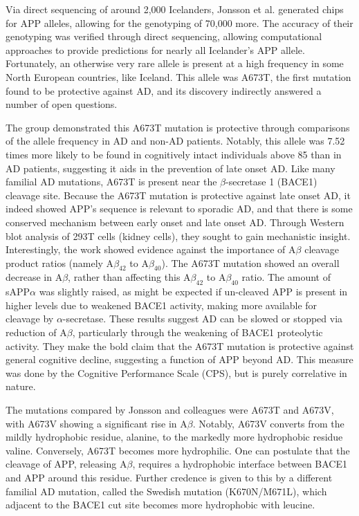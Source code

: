 Via direct sequencing of around 2,000 Icelanders, Jonsson et al. generated chips for APP alleles, allowing for the genotyping of 70,000 more. The accuracy of their genotyping was verified through direct sequencing, allowing computational approaches to provide predictions for nearly all Icelander's APP allele. Fortunately, an otherwise very rare allele is present at a high frequency in some North European countries, like Iceland. This allele was A673T, the first mutation found to be protective against AD, and its discovery indirectly answered a number of open questions. \newline

The group demonstrated this A673T mutation is protective through comparisons of the allele frequency in AD and non-AD patients. Notably, this allele was 7.52 times more likely to be found in cognitively intact individuals above 85 than in AD patients, suggesting it aids in the prevention of late onset AD. Like many familial AD mutations, A673T is present near the $\beta$-secretase 1 (BACE1) cleavage site. Because the A673T mutation is protective against late onset AD, it indeed showed APP's sequence is relevant to sporadic AD, and that there is some conserved mechanism between early onset and late onset AD. Through Western blot analysis of 293T cells (kidney cells), they sought to gain mechanistic insight. Interestingly, the work showed evidence against the importance of A$\beta$ cleavage product ratios (namely A$\beta_{42}$ to A$\beta_{40}$). The A673T mutation showed an overall decrease in A$\beta$, rather than affecting this A$\beta_{42}$ to A$\beta_{40}$ ratio. The amount of sAPP$\alpha$ was slightly raised, as might be expected if un-cleaved APP is present in higher levels due to weakened BACE1 activity, making more available for cleavage by $\alpha$-secretase. These results suggest AD  can be slowed or stopped via reduction of A$\beta$, particularly through the weakening of BACE1 proteolytic activity. They make the bold claim that the A673T mutation is protective against general cognitive decline, suggesting a function of APP beyond AD. This measure was done by the Cognitive Performance Scale (CPS), but is purely correlative in nature.\newline

The mutations compared by Jonsson  and colleagues were A673T and A673V, with A673V showing a significant rise in A$\beta$. Notably, A673V converts from the mildly hydrophobic residue, alanine, to the markedly more hydrophobic residue valine. Conversely, A673T becomes more hydrophilic. One can postulate that the cleavage of APP, releasing A$\beta$, requires a hydrophobic interface between BACE1 and APP around this residue. Further credence is given to this by a different familial AD mutation, called the Swedish mutation (K670N/M671L), which adjacent to the BACE1 cut site becomes more hydrophobic with leucine.\newline

